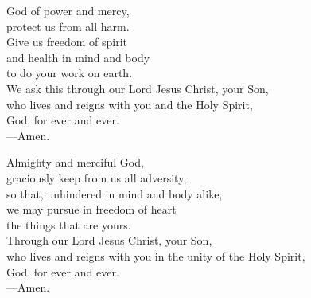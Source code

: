 \prayer


\begin{prayerverse}
God of power and mercy,\\
protect us from all harm.\\
Give us freedom of spirit\\
and health in mind and body\\
to do your work on earth.\\
We ask this through our Lord Jesus Christ, your Son,\\
who lives and reigns with you and the Holy Spirit,\\
God, for ever and ever.\\
{\color{red}---\thinspace}Amen.
\end{prayerverse}


\begin{prayerverse}
Almighty and merciful God,\\
graciously keep from us all adversity,\\
so that, unhindered in mind and body alike,\\
we may pursue in freedom of heart\\
the things that are yours.\\
Through our Lord Jesus Christ, your Son,\\
who lives and reigns with you in the unity of the Holy Spirit,\\
God, for ever and ever.\\
{\color{red}---\thinspace}Amen.
\end{prayerverse}

